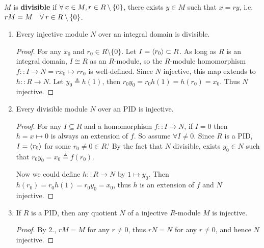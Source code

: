\begin{definition}
  $M$ is {\bf divisible} if $\forall x\in M, r \in R \setminus \set{0}$, there exists
  $y \in M$ such that $x = ry$, i.e. $rM = M \quad \forall r \in R \setminus \set{0}$.
\end{definition}

\begin{prop} \mbox{} \label{prop:injective-and-divisible}
  \begin{enumerate}
    \item Every injective module $N$ over an integral domain is divisible.
      \begin{proof}
        For any $x_0$ and $r_0 \in R \setminus \{0\}$. Let
        $I = \langle r_0\rangle \subset R$. As long as $R$ is an integral domain,
        $I \cong R$ as an $R$-module, so the $R$-module homomorphism
        $f :: I \to N = r x_0 \mapsto r r_0$ is well-defined.
        Since $N$ injective, this map extends to $h :: R \to N$.
        Let $y_0 \triangleq h(1)$, then $r_0 y_0 = r_0 h(1) = h(r_0) = x_0$.
        Thus $N$ injective.
      \end{proof}
    \item Every divisible module $N$ over an PID is injective.
      \begin{proof}
        For any $I \subseteq R$ and a homomorphism $f :: I \to N$, if $I = 0$ then
        $h = x \mapsto 0$ is always an extension of $f$.
        So assume $\forall I \neq 0$. Since $R$ is a PID,
        $I = \langle r_0\rangle$ for some $r_0 \neq 0 \in R$.'
        By the fact that $N$ divisible, exists $y_0 \in N$
        such that $r_0 y_0 = x_0 \triangleq f(r_0)$.

        Now we could define
        $h :: R \to N$ by $1 \mapsto y_0$.
        Then $h(r_0) = r_0 h(1) = r_0 y_0 = x_0$, thus
        $h$ is an extension of $f$ and $N$ injective.
     \end{proof}
     \item If $R$ is a PID, then any quotient $N$ of a injective $R$-module $M$
       is injective.
       \begin{proof}
        By 2., $rM = M$ for any $r \neq 0$, thus $rN = N$ for any $r \neq 0$,
        and hence $N$ injective.
       \end{proof}
  \end{enumerate}
\end{prop}

